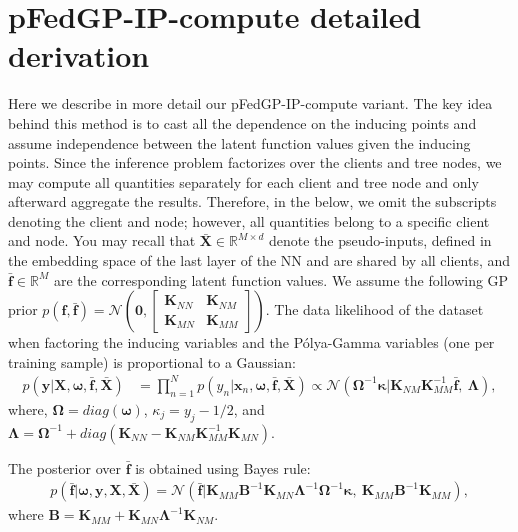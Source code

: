 \documentclass{article}
\newcommand{\normal}{\mathcal{N}}
\newcommand{\bld}[1]{\boldsymbol{#1}}
\def\rvf{{\mathbf{f}}}
\def\rvx{{\mathbf{x}}}
\def\rvy{{\mathbf{y}}}
\def\rmB{{\mathbf{B}}}
\def\rmX{{\mathbf{X}}}
\def\sR{{\mathbb{R}}}
\newcommand{\pg}{P\'olya-Gamma }
\newcommand{\Knn}{\mathbf{K}_{NN}}
\newcommand{\Kmm}{\mathbf{K}_{MM}}
\newcommand{\Kmn}{\mathbf{K}_{MN}}
\newcommand{\Knm}{\mathbf{K}_{NM}}
\newcommand{\KmmInv}{\mathbf{K}_{MM}^{-1}}
\newcommand{\rvfbar}{\bar{\bld{\mathbf{f}}}}
\newcommand{\rvomega}{\bld{\mathbf{\omega}}}
\newcommand{\rvkappa}{\bld{\mathbf{\kappa}}}
\newcommand{\rmOmega}{\mathbf{\Omega}}
\newcommand{\rmOmegaInv}{\mathbf{\Omega}^{-1}}
\newcommand{\rmLambda}{\mathbf{\Lambda}}
\newcommand{\rmLambdaInv}{\mathbf{\Lambda}^{-1}}
\newcommand{\rmXbar}{\bar{\mathbf{\mathbf{X}}}}
\newcommand{\rmQInv}{\mathbf{B}^{-1}}
\begin{document}
\section{pFedGP-IP-compute detailed derivation} \label{sec_app:pFedGP_comp_derivation}
Here we describe in more detail our pFedGP-IP-compute variant. 
The key idea behind this method is to cast all the dependence on the inducing points and assume independence between the latent function values given the inducing points. Since the inference problem factorizes over the clients and tree nodes, we may compute all quantities separately for each client and tree node and only afterward aggregate the results. Therefore, in the below, we omit the subscripts denoting the client and node; however, all quantities belong to a specific client and node. You may recall that $\rmXbar \in \sR^{M\times d}$ denote the pseudo-inputs, defined in the embedding space of the last layer of the NN and are shared by all clients, and $\rvfbar \in \sR^{M}$ are the corresponding latent function values. We assume the following GP prior $p(\rvf, \rvfbar) = \normal(\bld{0},[\begin{matrix} \Knn & \Knm \\ \Kmn & \Kmm \end{matrix}])$. The data likelihood of the dataset when factoring the inducing variables and the \pg variables (one per training sample) is proportional to a Gaussian:
\begin{equation} \label{eq:ip2_likelihood}
    \begin{aligned}
    p(\rvy | \rmX, \rvomega, \rvfbar, \rmXbar) &= \displaystyle \prod_{n=1}^{N} p(y_n | \rvx_n, \rvomega, \rvfbar, \rmXbar) \propto \normal(\rmOmega^{-1} \rvkappa | \Knm\KmmInv\rvfbar,~\rmLambda),
    \end{aligned}
\end{equation}
where, $\rmOmega = diag(\rvomega)$, $\kappa_j = y_j - 1/2$, and $\rmLambda = \rmOmegaInv + diag(\Knn - \Knm\KmmInv\Kmn)$. 

The posterior over $\rvfbar$ is obtained using Bayes rule:
\begin{equation} \label{eq:posterior_fbar}
    \begin{aligned}
    p(\rvfbar | \rvomega, \rvy, \rmX, \rmXbar) = \normal(\rvfbar | \Kmm\rmQInv\Kmn\rmLambdaInv \rmOmega^{-1} \rvkappa,~\Kmm\rmQInv\Kmm),
    \end{aligned}
\end{equation}
where $\rmB = \Kmm + \Kmn\rmLambdaInv\Knm$.
\end{document}
